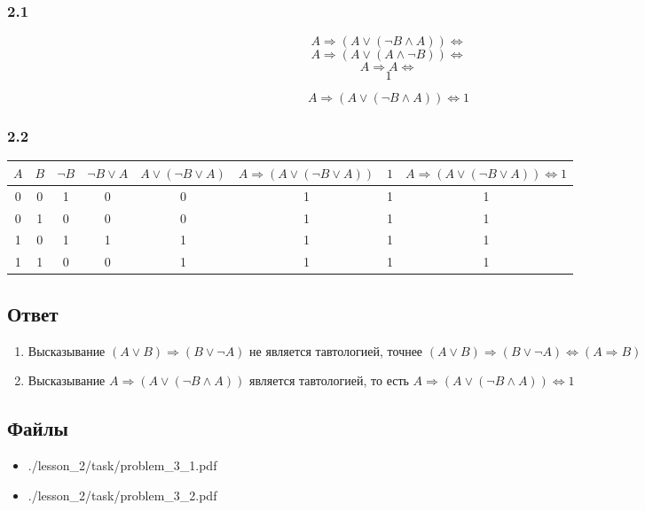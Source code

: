 \subsubsection*{2.1}

\[A \Rightarrow (A \vee (\neg B \wedge A)) \Leftrightarrow\]
\[A \Rightarrow (A \vee (A \wedge \neg B)) \Leftrightarrow\]
\[A \Rightarrow A \Leftrightarrow\]
\[1\]

\[A \Rightarrow (A \vee (\neg B \wedge A)) \Leftrightarrow 1\]

\subsubsection*{2.2}

\begin{center}
  \begin{tabular}{c c | c c  c c| c | c}
     \(A\) &
     \(B\) &
     \(\neg B\) &
     \(\neg B \vee A\) &
     \(A \vee (\neg B \vee A)\) &
     \(A \Rightarrow (A \vee (\neg B \vee A))\) &
     \(1\)&
     \(A \Rightarrow (A \vee (\neg B \vee A)) \Leftrightarrow 1\) \\
     \hline
     0 & 0 & 1 & 0 & 0 & 1 & 1 & 1 \\
     0 & 1 & 0 & 0 & 0 & 1 & 1 & 1 \\
     1 & 0 & 1 & 1 & 1 & 1 & 1 & 1 \\
     1 & 1 & 0 & 0 & 1 & 1 & 1 & 1
  \end{tabular}
\end{center}

\subsection*{Ответ}

\begin{enumerate}
  \item Высказывание
  \((A \vee B) \Rightarrow (B \vee \neg A)\)
  не является тавтологией, точнее
  \((A \vee B) \Rightarrow (B \vee \neg A) \Leftrightarrow (A \Rightarrow B)\)
  \item Высказывание
  \(A \Rightarrow  (A \vee (\neg B \wedge A))\)
  является тавтологией, то есть
  \(A \Rightarrow  (A \vee (\neg B \wedge A)) \Leftrightarrow 1\)
\end{enumerate}

\subsection*{Файлы}

\begin{itemize}
  \item ./lesson\_2/task/problem\_3\_1.pdf
  \item ./lesson\_2/task/problem\_3\_2.pdf
\end{itemize}
